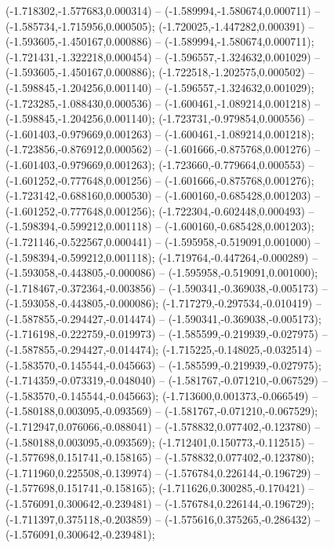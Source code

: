  (-1.718302,-1.577683,0.000314) -- (-1.589994,-1.580674,0.000711) -- (-1.585734,-1.715956,0.000505);
 (-1.720025,-1.447282,0.000391) -- (-1.593605,-1.450167,0.000886) -- (-1.589994,-1.580674,0.000711);
 (-1.721431,-1.322218,0.000454) -- (-1.596557,-1.324632,0.001029) -- (-1.593605,-1.450167,0.000886);
 (-1.722518,-1.202575,0.000502) -- (-1.598845,-1.204256,0.001140) -- (-1.596557,-1.324632,0.001029);
 (-1.723285,-1.088430,0.000536) -- (-1.600461,-1.089214,0.001218) -- (-1.598845,-1.204256,0.001140);
 (-1.723731,-0.979854,0.000556) -- (-1.601403,-0.979669,0.001263) -- (-1.600461,-1.089214,0.001218);
 (-1.723856,-0.876912,0.000562) -- (-1.601666,-0.875768,0.001276) -- (-1.601403,-0.979669,0.001263);
 (-1.723660,-0.779664,0.000553) -- (-1.601252,-0.777648,0.001256) -- (-1.601666,-0.875768,0.001276);
 (-1.723142,-0.688160,0.000530) -- (-1.600160,-0.685428,0.001203) -- (-1.601252,-0.777648,0.001256);
 (-1.722304,-0.602448,0.000493) -- (-1.598394,-0.599212,0.001118) -- (-1.600160,-0.685428,0.001203);
 (-1.721146,-0.522567,0.000441) -- (-1.595958,-0.519091,0.001000) -- (-1.598394,-0.599212,0.001118);
 (-1.719764,-0.447264,-0.000289) -- (-1.593058,-0.443805,-0.000086) -- (-1.595958,-0.519091,0.001000);
 (-1.718467,-0.372364,-0.003856) -- (-1.590341,-0.369038,-0.005173) -- (-1.593058,-0.443805,-0.000086);
 (-1.717279,-0.297534,-0.010419) -- (-1.587855,-0.294427,-0.014474) -- (-1.590341,-0.369038,-0.005173);
 (-1.716198,-0.222759,-0.019973) -- (-1.585599,-0.219939,-0.027975) -- (-1.587855,-0.294427,-0.014474);
 (-1.715225,-0.148025,-0.032514) -- (-1.583570,-0.145544,-0.045663) -- (-1.585599,-0.219939,-0.027975);
 (-1.714359,-0.073319,-0.048040) -- (-1.581767,-0.071210,-0.067529) -- (-1.583570,-0.145544,-0.045663);
 (-1.713600,0.001373,-0.066549) -- (-1.580188,0.003095,-0.093569) -- (-1.581767,-0.071210,-0.067529);
 (-1.712947,0.076066,-0.088041) -- (-1.578832,0.077402,-0.123780) -- (-1.580188,0.003095,-0.093569);
 (-1.712401,0.150773,-0.112515) -- (-1.577698,0.151741,-0.158165) -- (-1.578832,0.077402,-0.123780);
 (-1.711960,0.225508,-0.139974) -- (-1.576784,0.226144,-0.196729) -- (-1.577698,0.151741,-0.158165);
 (-1.711626,0.300285,-0.170421) -- (-1.576091,0.300642,-0.239481) -- (-1.576784,0.226144,-0.196729);
 (-1.711397,0.375118,-0.203859) -- (-1.575616,0.375265,-0.286432) -- (-1.576091,0.300642,-0.239481);
